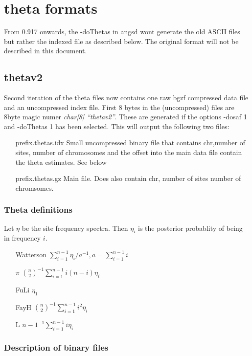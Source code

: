 \documentclass[10pt]{article}
\begin{document}
\newpage
\section{theta formats}
From 0.917 onwards, the -doThetas in angsd wont generate the old ASCII files but rather the indexed file as described below. The original format will not be described in this document.\\


\subsection{thetav2}
Second iteration of the theta files now contains one raw bgzf compressed data file and an uncompressed index file. First 8 bytes in the (uncompressed) files are 8byte magic numer \emph{char[8] ``thetav2''}. These are generated if the options -dosaf 1 and -doThetas 1 has been selected. This will output the following two files:

\begin{itemize}
\item[prefix.thetas.idx] Small uncompressed binary file that contains chr,number of sites, number of chromosomes and the offset into the main data file contain the theta estimates. See below
\item[prefix.thetas.gz] Main file. Does also contain chr, number of sites number of chromsomes.
\end{itemize}

\subsubsection{Theta definitions}
Let $\eta$ be the site frequency spectra. Then $\eta_i$ is the posterior probablity of being in frequency $i$. 
\begin{itemize}
\item[Watterson] $\sum_{i=1}^{n-1}\eta_i/a^{-1}, a=\sum_{i=1}^{n-1}i$
\item[$\pi$] $ {{n}\choose{2}}^{-1}\sum_{i=1}^{n-1}i(n-i)\eta_i$
\item[FuLi] $\eta_1$
\item[FayH] $ {{n}\choose{2}}^{-1}\sum_{i=1}^{n-1}i^2\eta_i$ 
\item[L] $ {n-1}^{-1}\sum_{i=1}^{n-1}i\eta_i$ 
\end{itemize}

\subsubsection{Description of binary files}
\end{document}
